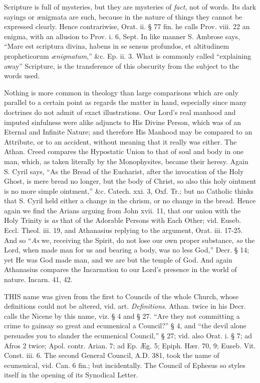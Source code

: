 Scripture is full of mysteries, but they are
mysteries of \emph{fact}, not
of words. Its dark sayings or ænigmata are such, because in the
nature of things they cannot be expressed clearly. Hence contrariwise,
Orat. ii. § 77 fin. he calls Prov. viii. 22 an enigma, with an allusion
to Prov. i. 6, Sept. In like manner S. Ambrose says, ``Mare est
scriptura divina, habens in se sensus profundos, et altitudinem
propheticorum \emph{ænigmatum},'' \&c. Ep. ii. 3. What is commonly
called ``explaining away'' Scripture, is the transference of this
obscurity from the subject to the words used.

Nothing is more common in theology than large
comparisons which are only parallel to a certain point as regards the
matter in hand, especially since many doctrines do not admit of exact
illustrations. Our Lord's real manhood and imputed sinfulness were
alike adjuncts to His Divine Person, which was of an Eternal and
Infinite Nature; and therefore His Manhood may be compared to an
Attribute, or to an accident, without meaning that it really was
either. The Athan. Creed compares the Hypostatic Union to that of soul
and body in one man, which, as taken literally by the Monophysites,
became their heresy. Again S. Cyril says, ``As the Bread of the
Eucharist, after the invocation of the Holy Ghost, is mere bread no
longer, but the body of Christ, so also this holy ointment is no more
simple ointment,'' \&c. Catech. xxi. 3, Oxf. Tr.; but no Catholic
thinks that S. Cyril held either a change in the chrism, or no change
in the bread. Hence again we find the Arians arguing from John xvii.
11, that our union with the Holy Trinity is \emph{as}
that of the Adorable Persons with Each Other; vid. Euseb. Eccl.
Theol. iii. 19, and Athanasius replying to the argument, Orat. iii.
17-25. And so ``\emph{As} we, receiving the Spirit, do not lose our own proper substance, \emph{so}
the Lord, when made man for us and bearing a body, was no less
God,'' Decr. § 14; yet He was God made man, and we are but the temple
of God. And again Athanasius compares the Incarnation to our Lord's
presence in the world of nature. Incarn. 41, 42.


THIS
name was given from the first to Councils of the whole Church, whose
definitions could not be altered, vid. art. \emph{Definitions}.
Athan. twice in his Decr. calls the Nicene by this name, viz.
§ 4 and § 27. ``Are they not committing a crime to gainsay so great
and ecumenical a Council?'' § 4, and ``the devil alone persuades you to
slander the ecumenical Council,'' § 27; vid. also Orat. i. § 7; ad
Afros 2 twice; Apol. contr. Arian. 7; ad Ep. Æg. 5; Epiph. Hær. 70,
9; Euseb. Vit. Const. iii. 6. The second General Council, A.D. 381, took the name of ecumenical, vid.
Can. 6 fin.; but incidentally. The Council of Ephesus so styles itself
in the opening of its Synodical Letter.

